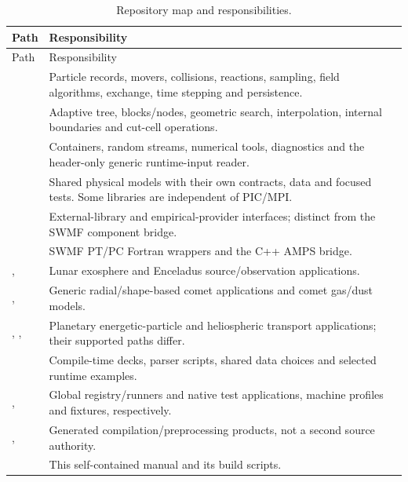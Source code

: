 \begin{longtable}{L{0.25\textwidth}L{0.65\textwidth}}
\caption{Repository map and responsibilities.}\label{tab:tree}\\
\toprule Path & Responsibility\\\midrule\endfirsthead
\toprule Path & Responsibility\\\midrule\endhead
{} & Particle records, movers, collisions, reactions, sampling,
field algorithms, exchange, time stepping and persistence.\\
 & Adaptive tree, blocks/nodes, geometric search,
interpolation, internal boundaries and cut-cell operations.\\
 & Containers, random streams, numerical tools, diagnostics
and the header-only generic runtime-input reader.\\
 & Shared physical models with their own contracts, data
and focused tests. Some libraries are independent of PIC/MPI.\\
 & External-library and empirical-provider interfaces;
distinct from the SWMF component bridge.\\
 & SWMF PT/PC Fortran wrappers and the C++ AMPS bridge.\\
,  & Lunar exosphere and Enceladus
source/observation applications.\\
,  & Generic radial/shape-based comet
applications and comet gas/dust models.\\
, ,  & Planetary energetic-particle
and heliospheric transport applications; their supported paths differ.\\
 & Compile-time decks, parser scripts, shared data choices and
selected runtime examples.\\
,  & Global registry/runners and native test
applications, machine profiles and fixtures, respectively.\\
,  & Generated compilation/preprocessing products,
not a second source authority.\\
 & This self-contained manual and its build scripts.\\
\bottomrule
\end{longtable}

